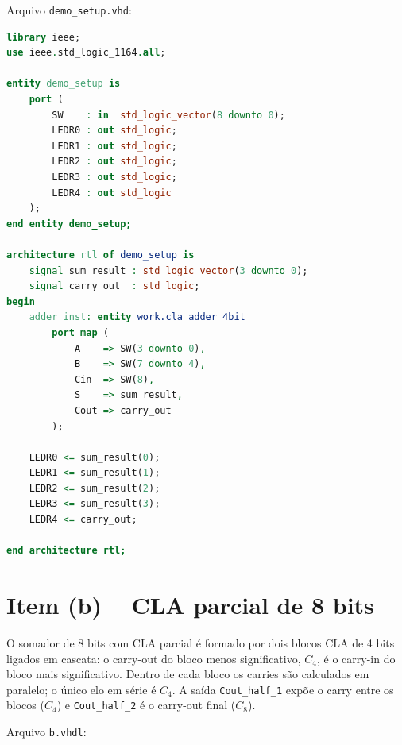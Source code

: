 \documentclass[report, 12pt]{uftreport}
\begin{document}
Arquivo \texttt{demo\_setup.vhd}:

\begin{lstlisting}[language=VHDL]
library ieee;
use ieee.std_logic_1164.all;

entity demo_setup is
    port (
        SW    : in  std_logic_vector(8 downto 0);
        LEDR0 : out std_logic;
        LEDR1 : out std_logic;
        LEDR2 : out std_logic;
        LEDR3 : out std_logic;
        LEDR4 : out std_logic
    );
end entity demo_setup;

architecture rtl of demo_setup is
    signal sum_result : std_logic_vector(3 downto 0);
    signal carry_out  : std_logic;
begin
    adder_inst: entity work.cla_adder_4bit
        port map (
            A    => SW(3 downto 0),
            B    => SW(7 downto 4),
            Cin  => SW(8),
            S    => sum_result,
            Cout => carry_out
        );

    LEDR0 <= sum_result(0);
    LEDR1 <= sum_result(1);
    LEDR2 <= sum_result(2);
    LEDR3 <= sum_result(3);
    LEDR4 <= carry_out;

end architecture rtl;
\end{lstlisting}

\section{Item (b) -- CLA parcial de 8 bits}

O somador de 8 bits com CLA parcial é formado por dois blocos CLA de 4 bits ligados em cascata: o carry-out do bloco menos significativo, $C_4$, é o carry-in do bloco mais significativo. Dentro de cada bloco os carries são calculados em paralelo; o único elo em série é $C_4$. A saída \texttt{Cout\_half\_1} expõe o carry entre os blocos ($C_4$) e \texttt{Cout\_half\_2} é o carry-out final ($C_8$).

Arquivo \texttt{b.vhdl}:
\end{document}
